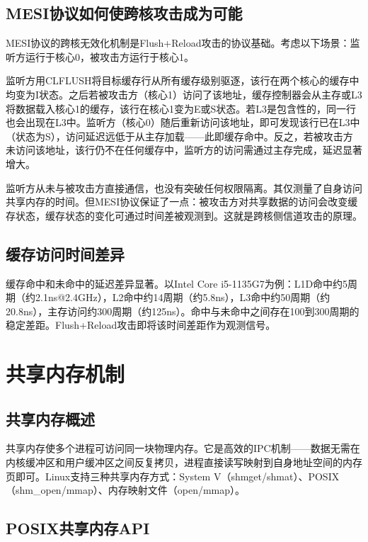 \subsection{MESI协议如何使跨核攻击成为可能}

MESI协议的跨核无效化机制是Flush+Reload攻击的协议基础。考虑以下场景：监听方运行于核心0，被攻击方运行于核心1。

监听方用CLFLUSH将目标缓存行从所有缓存级别驱逐，该行在两个核心的缓存中均变为I状态。之后若被攻击方（核心1）访问了该地址，缓存控制器会从主存或L3将数据载入核心1的缓存，该行在核心1变为E或S状态。若L3是包含性的，同一行也会出现在L3中。监听方（核心0）随后重新访问该地址，即可发现该行已在L3中（状态为S），访问延迟远低于从主存加载——此即缓存命中。反之，若被攻击方未访问该地址，该行仍不在任何缓存中，监听方的访问需通过主存完成，延迟显著增大。

监听方从未与被攻击方直接通信，也没有突破任何权限隔离。其仅测量了自身访问共享内存的时间。但MESI协议保证了一点：被攻击方对共享数据的访问会改变缓存状态，缓存状态的变化可通过时间差被观测到。这就是跨核侧信道攻击的原理。

\subsection{缓存访问时间差异}

缓存命中和未命中的延迟差异显著。以Intel Core i5-1135G7为例：L1D命中约5周期（约2.1ns@2.4GHz），L2命中约14周期（约5.8ns），L3命中约50周期（约20.8ns），主存访问约300周期（约125ns）。命中与未命中之间存在100到300周期的稳定差距。Flush+Reload攻击即将该时间差距作为观测信号。

\section{共享内存机制}

\subsection{共享内存概述}

共享内存使多个进程可访问同一块物理内存。它是高效的IPC机制——数据无需在内核缓冲区和用户缓冲区之间反复拷贝，进程直接读写映射到自身地址空间的内存页即可。Linux支持三种共享内存方式：System V（shmget/shmat）、POSIX（shm\_open/mmap）、内存映射文件（open/mmap）。

\subsection{POSIX共享内存API}

